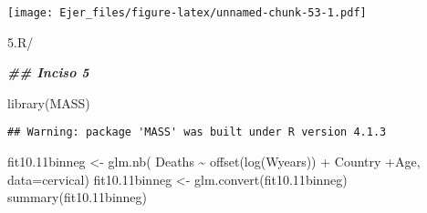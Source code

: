 \documentclass[
]{article}
\newenvironment{Shaded}{\begin{snugshade}}{\end{snugshade}}
\newcommand{\AttributeTok}[1]{\textcolor[rgb]{0.77,0.63,0.00}{#1}}
\newcommand{\DecValTok}[1]{\textcolor[rgb]{0.00,0.00,0.81}{#1}}
\newcommand{\DocumentationTok}[1]{\textcolor[rgb]{0.56,0.35,0.01}{\textbf{\textit{#1}}}}
\newcommand{\FloatTok}[1]{\textcolor[rgb]{0.00,0.00,0.81}{#1}}
\newcommand{\FunctionTok}[1]{\textcolor[rgb]{0.00,0.00,0.00}{#1}}
\newcommand{\NormalTok}[1]{#1}
\newcommand{\OtherTok}[1]{\textcolor[rgb]{0.56,0.35,0.01}{#1}}
\newcommand{\SpecialCharTok}[1]{\textcolor[rgb]{0.00,0.00,0.00}{#1}}
\begin{document}
\begin{Shaded}
\end{Shaded}

\texttt{[image: Ejer\_files/figure-latex/unnamed-chunk-53-1.pdf]}

5.R/

\begin{Shaded}
\begin{Highlighting}[]
\DocumentationTok{\#\# Inciso 5}

\FunctionTok{library}\NormalTok{(MASS)}
\end{Highlighting}
\end{Shaded}

\begin{verbatim}
## Warning: package 'MASS' was built under R version 4.1.3
\end{verbatim}

\begin{Shaded}
\begin{Highlighting}[]
\NormalTok{fit10}\FloatTok{.11}\NormalTok{binneg }\OtherTok{\textless{}{-}} \FunctionTok{glm.nb}\NormalTok{( Deaths }\SpecialCharTok{\textasciitilde{}} \FunctionTok{offset}\NormalTok{(}\FunctionTok{log}\NormalTok{(Wyears)) }\SpecialCharTok{+}\NormalTok{ Country }\SpecialCharTok{+}\NormalTok{Age, }\AttributeTok{data=}\NormalTok{cervical)}
\NormalTok{fit10}\FloatTok{.11}\NormalTok{binneg }\OtherTok{\textless{}{-}} \FunctionTok{glm.convert}\NormalTok{(fit10}\FloatTok{.11}\NormalTok{binneg)}
\FunctionTok{summary}\NormalTok{(fit10}\FloatTok{.11}\NormalTok{binneg)}
\end{Highlighting}
\end{Shaded}
\end{document}
